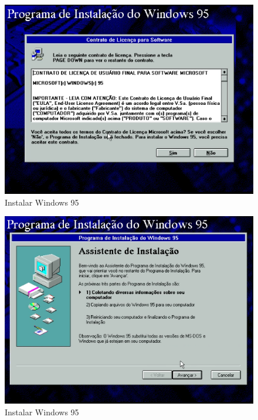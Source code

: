 \documentclass{report}
\begin{document}
\begin{figure}
\centering
\includegraphics[width=\textwidth]{Screenshot_30.png}
\caption{Instalar Windows 95}
\label{fig:30}
\end{figure}

\begin{figure}
\centering
\includegraphics[width=\textwidth]{Screenshot_31.png}
\caption{Instalar Windows 95}
\label{fig:31}
\end{figure}
\end{document}
